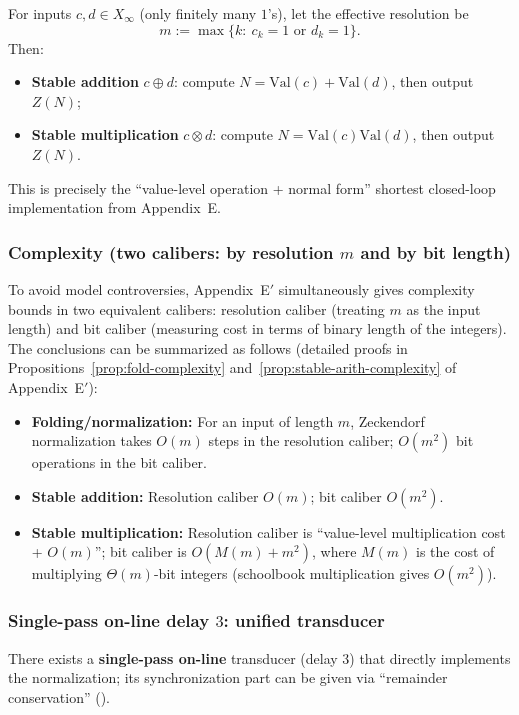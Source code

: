 For inputs $c,d\in X_\infty$ (only finitely many $1$'s), let the effective resolution be
\[
m:=\max\{k:\ c_k=1\text{ or }d_k=1\}.
\]
Then:
\begin{itemize}
  \item \textbf{Stable addition} $c\oplus d$: compute $N=\mathrm{Val}(c)+\mathrm{Val}(d)$, then output $Z(N)$;
  \item \textbf{Stable multiplication} $c\otimes d$: compute $N=\mathrm{Val}(c)\mathrm{Val}(d)$, then output $Z(N)$.
\end{itemize}
This is precisely the ``value-level operation + normal form'' shortest closed-loop implementation from Appendix~E.

\subsubsection{Complexity (two calibers: by resolution \texorpdfstring{$m$}{m} and by bit length)}

To avoid model controversies, Appendix~E$'$ simultaneously gives complexity bounds in two equivalent calibers: resolution caliber (treating $m$ as the input length) and bit caliber (measuring cost in terms of binary length of the integers). The conclusions can be summarized as follows (detailed proofs in Propositions~\ref{prop:fold-complexity} and~\ref{prop:stable-arith-complexity} of Appendix~E$'$):

\begin{itemize}
  \item \textbf{Folding/normalization:} For an input of length $m$, Zeckendorf normalization takes $O(m)$ steps in the resolution caliber; $O(m^2)$ bit operations in the bit caliber.
  \item \textbf{Stable addition:} Resolution caliber $O(m)$; bit caliber $O(m^2)$.
  \item \textbf{Stable multiplication:} Resolution caliber is ``value-level multiplication cost + $O(m)$''; bit caliber is $O(M(m)+m^2)$, where $M(m)$ is the cost of multiplying $\Theta(m)$-bit integers (schoolbook multiplication gives $O(m^2)$).
\end{itemize}

\subsubsection{Single-pass on-line delay \texorpdfstring{$3$}{3}: unified transducer}\label{subsec:online-delay}
There exists a \textbf{single-pass on-line} transducer (delay $3$) that directly implements the normalization; its synchronization part can be given via ``remainder conservation'' (\cite{Frougny1999OnlineAddition}).

